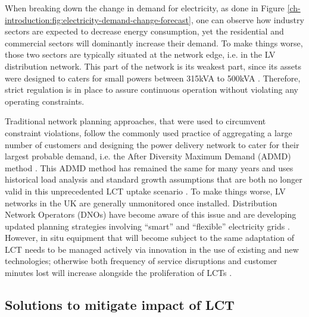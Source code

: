 When breaking down the change in demand for electricity, as done in Figure \ref{ch-introduction:fig:electricity-demand-change-forecast}, one can observe how industry sectors are expected to decrease energy consumption, yet the residential and commercial sectors will dominantly increase their demand.
To make things worse, those two sectors are typically situated at the network edge, i.e. in the LV distribution network.
This part of the network is its weakest part, since its assets were designed to caters for small powers between 315kVA to 500kVA \cite{EDS08-0115}.
Therefore, strict regulation is in place to assure continuous operation without violating any operating constraints. 

Traditional network planning approaches, that were used to circumvent constraint violations, follow the commonly used practice of aggregating a large number of customers and designing the power delivery network to cater for their largest probable demand, i.e. the After Diversity Maximum Demand (ADMD) method \cite{Richardson2010a}.
This ADMD method has remained the same for many years and uses historical load analysis and standard growth assumptions that are both no longer valid in this unprecedented LCT uptake scenario \cite{Yunusov2016}.
To make things worse, LV networks in the UK are generally unmonitored once installed.
Distribution Network Operators (DNOs) have become aware of this issue and are developing updated planning strategies involving ``smart'' and ``flexible'' electricity grids \cite{Fang2012}.
However, in situ equipment that will become subject to the same adaptation of LCT needs to be managed actively via innovation in the use of existing and new technologies; otherwise both frequency of service disruptions and customer minutes lost will increase alongside the proliferation of LCTs \cite{Ault2008a}.

\subsection{Solutions to mitigate impact of LCT}
\label{ch-introduction:subsec:solutions-to-mitigate-impact-of-lct}

